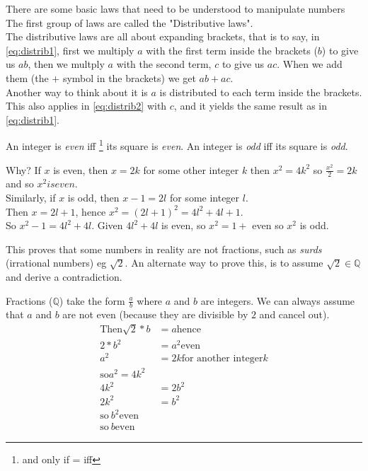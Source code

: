 There are some basic laws that need to be understood to manipulate numbers
The first group of laws are called the "Distributive laws".
\\
The distributive laws are all about expanding brackets, that is to say, in
\ref{eq:distrib1}, first we multiply $a$ with the first term inside the
brackets ($b$) to give us $ab$, then we multply $a$ with the second term, $c$
to give us $ac$. When we add them (the $+$ symbol in the brackets) we get
$ab + ac$.
\\
Another way to think about it is $a$ is distributed to each term inside the
brackets. This also applies in \ref{eq:distrib2} with $c$, and it yields the 
same result as in \ref{eq:distrib1}.

An integer is \emph{even} iff \footnote{and only if = iff} its square is
\emph{even}. An integer is \emph{odd} iff its square is \emph{odd}.

Why? If $x$ is even, then $x = 2k$ for some other integer $k$ then $x^2 = 4k^2$
so $\frac{x^2}{2} = 2k$ and so $x^2 is even$.\\
Similarly, if $x$ is odd, then $x-1 = 2l$ for some integer $l$. \\
Then $x = 2l + 1$, hence $x^2 = (2l +1)^2 = 4l^2 + 4l + 1$. \\
So $x^2 - 1 = 4l^2 + 4l$. Given $4l^2 + 4l$ is even, so $x^2 = 1 + $ even so
$x^2$ is odd.

This proves that some numbers in reality are not fractions, such as \emph{surds}
(irrational numbers) eg $\sqrt{2}$. An alternate way to prove this, is to assume
$\sqrt{2} \in \mathbb{Q}$ and derive a contradiction.

Fractions ($\mathbb{Q}$) take the form $\frac{a}{b}$ where $a$ and $b$ are
integers. We can always assume that $a$ and $b$ are not even (because they are
divisible by $2$ and cancel out).
\begin{align}
  \text{Then} \sqrt{2}*b & = a \text{hence} \\
  2* b^2 & = a^2 \text{even} \\
  a^2 & = 2k \text{for another integer} k \\
  \text{so} a^2 = 4k^2 \\
  4k^2 & = 2b^2 \\
  2k^2 & = b^2 \\
  \text{so} ~ b^2 \text{even} \\
  \text{so} ~ b \text{even}
\end{align}

